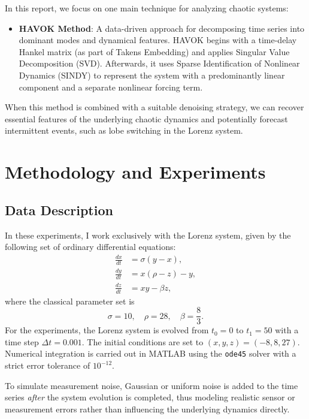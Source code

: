 \documentclass[11pt]{article}
\begin{document}
	In this report, we focus on one main technique for analyzing chaotic systems:
	\begin{itemize}
		\item \textbf{HAVOK Method}: A data-driven approach for decomposing time series into dominant modes and dynamical features. HAVOK begins with a time-delay Hankel matrix (as part of Takens Embedding) and applies Singular Value Decomposition (SVD). Afterwards, it uses Sparse Identification of Nonlinear Dynamics (SINDY) \citep{brunton2015} to represent the system with a predominantly linear component and a separate nonlinear forcing term.
	\end{itemize}
	
	When this method is combined with a suitable denoising strategy, we can recover essential features of the underlying chaotic dynamics and potentially forecast intermittent events, such as lobe switching in the Lorenz system.
	
	\section{Methodology and Experiments}
	
	\subsection{Data Description}
	In these experiments, I work exclusively with the Lorenz system, given by the following set of ordinary differential equations:
	\begin{equation}
		\begin{aligned}
			\frac{dx}{dt} &= \sigma (y - x),\\
			\frac{dy}{dt} &= x(\rho - z) - y,\\
			\frac{dz}{dt} &= xy - \beta z,
		\end{aligned}
		\label{eq:lorenz}
	\end{equation}
	where the classical parameter set is
	\[
	\sigma = 10, \quad \rho = 28, \quad \beta = \frac{8}{3}.
	\]
	For the experiments, the Lorenz system is evolved from \(t_0 = 0\) to \(t_1 = 50\) with a time step \(\Delta t = 0.001\). The initial conditions are set to \((x, y, z) = (-8, 8, 27)\). Numerical integration is carried out in MATLAB using the \texttt{ode45} solver with a strict error tolerance of \(10^{-12}\).
	
	To simulate measurement noise, Gaussian or uniform noise is added to the time series \emph{after} the system evolution is completed, thus modeling realistic sensor or measurement errors rather than influencing the underlying dynamics directly.
	
\end{document}

